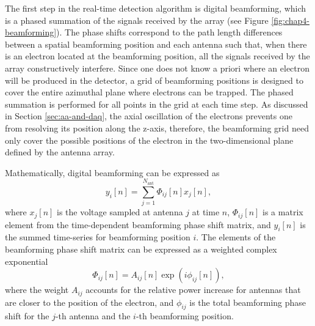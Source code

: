 The first step in the real-time detection algorithm is digital beamforming, which is a phased summation of the signals received by the array (see Figure \ref{fig:chap4-beamforming}). The phase shifts correspond to the path length differences between a spatial beamforming position and each antenna such that, when there is an electron located at the beamforming position, all the signals received by the array constructively interfere. Since one does not know a priori where an electron will be produced in the detector, a grid of beamforming positions is designed to cover the entire azimuthal plane where electrons can be trapped. The phased summation is performed for all points in the grid at each time step. As discussed in Section \ref{sec:aa-and-daq}, the axial oscillation of the electrons prevents one from resolving its position along the z-axis, therefore, the beamforming grid need only cover the possible positions of the electron in the two-dimensional plane defined by the antenna array. 

Mathematically, digital beamforming can be expressed as
\begin{equation}
    y_i[n] = \sum_{j=1}^{N_\mathrm{ant}}\Phi_{ij}[n]x_j[n],
    \label{eq:beamforming}
\end{equation}
where $x_j[n]$ is the voltage sampled at antenna $j$ at time $n$, $\Phi_{ij}[n]$ is a matrix element from the time-dependent beamforming phase shift matrix, and $y_i[n]$ is the summed time-series for beamforming position $i$. The elements of the beamforming phase shift matrix can be expressed as a weighted complex exponential
\begin{equation}
    \Phi_{ij}[n]=A_{ij}[n]\exp{\left(i\phi_{ij}[n]\right)},
\end{equation}
where the weight $A_{ij}$ accounts for the relative power increase for antennas that are closer to the position of the electron, and $\phi_{ij}$ is the total beamforming phase shift for the $j$-th antenna and the $i$-th beamforming position. 

